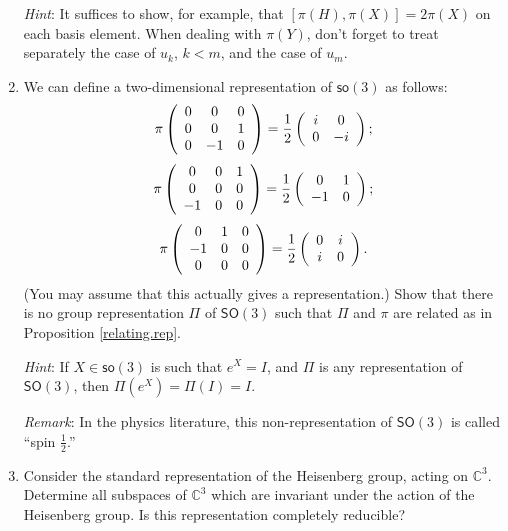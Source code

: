 \documentclass{amsbook}
\theoremstyle{plain}
\numberwithin{equation}{chapter}
\numberwithin{theorem}{chapter}
\begin{document}
\begin{enumerate}
\textit{Hint}: It suffices to show, for example, that $\left[  \pi
(H),\pi(X)\right]  =2\pi(X)$ on each basis element. When dealing with $\pi
(Y)$, don't forget to treat separately the case of $u_{k}$, $k<m$, and the
case of $u_{m}$.

\item \label{spin.half}We can define a two-dimensional representation of
$\mathsf{so}(3)$ as follows:
\[
\pi\left(
\begin{array}
[c]{ccc}%
0 & 0 & 0\\
0 & 0 & 1\\
0 & -1 & 0
\end{array}
\right)  =\frac{1}{2}\left(
\begin{array}
[c]{cc}%
i & 0\\
0 & -i
\end{array}
\right)  ;
\]%
\[
\pi\left(
\begin{array}
[c]{ccc}%
0 & 0 & 1\\
0 & 0 & 0\\
-1 & 0 & 0
\end{array}
\right)  =\frac{1}{2}\left(
\begin{array}
[c]{cc}%
0 & 1\\
-1 & 0
\end{array}
\right)  ;
\]%
\[
\pi\left(
\begin{array}
[c]{ccc}%
0 & 1 & 0\\
-1 & 0 & 0\\
0 & 0 & 0
\end{array}
\right)  =\frac{1}{2}\left(
\begin{array}
[c]{cc}%
0 & i\\
i & 0
\end{array}
\right)  \text{.}%
\]
(You may assume that this actually gives a representation.) Show that there is
no group representation $\Pi$ of $\mathsf{SO}(3)$ such that $\Pi$ and $\pi$
are related as in Proposition \ref{relating.rep}.

\textit{Hint}: If $X\in\mathsf{so}(3)$ is such that $e^{X}=I$, and $\Pi$ is
any representation of $\mathsf{SO}(3)$, then $\Pi(e^{X})=\Pi(I)=I$.

\textit{Remark}: In the physics literature, this non-representation of
$\mathsf{SO}(3)$ is called ``spin $\frac{1}{2}$.''

\item \label{heisenberg.inv}Consider the standard representation of the
Heisenberg group, acting on $\mathbb{C}^{3}$. Determine all subspaces of
$\mathbb{C}^{3}$ which are invariant under the action of the Heisenberg group.
Is this representation completely reducible?


\end{enumerate}
\end{document}
